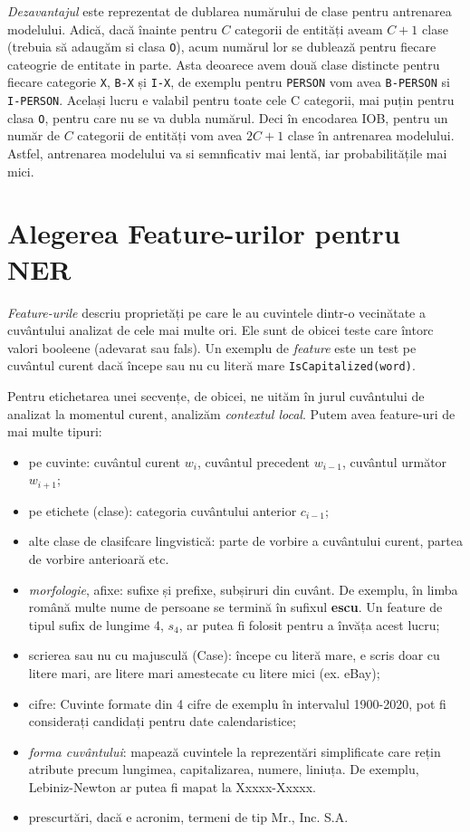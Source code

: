 \textit{Dezavantajul} este reprezentat de dublarea numărului de clase pentru antrenarea modelului. Adică, dacă înainte pentru $C$ categorii de entități aveam $C + 1 $ clase (trebuia să adaugăm si clasa \texttt{O}), acum numărul lor se dublează pentru fiecare cateogrie de entitate in parte. Asta deoarece avem două clase distincte pentru fiecare categorie \texttt{X}, \texttt{B-X} și \texttt{I-X}, de exemplu pentru \texttt{PERSON} vom avea \texttt{B-PERSON} si \texttt{I-PERSON}. Același lucru e valabil pentru toate cele C categorii, mai puțin pentru clasa \texttt{O}, pentru care nu se va dubla numărul. Deci în encodarea IOB, pentru un număr de $C$ categorii de entități vom avea $2C + 1 $ clase în antrenarea modelului. Astfel, antrenarea modelului va si semnficativ mai lentă, iar probabilitățile mai mici.

\section{Alegerea Feature-urilor pentru NER}

\textit{Feature-urile} descriu proprietăți pe care le au cuvintele dintr-o vecinătate a cuvântului analizat de cele mai multe ori. Ele sunt de obicei teste care întorc valori booleene (adevarat sau fals). Un exemplu de \textit{feature} este un test pe cuvântul curent dacă începe sau nu cu literă mare \texttt{IsCapitalized(word)}.

Pentru etichetarea unei secvențe, de obicei, ne uităm în jurul cuvântului de analizat la momentul curent, analizăm \textit{contextul local}. Putem avea feature-uri de mai multe tipuri:

\begin{itemize}
\item pe cuvinte: cuvântul curent $w_i$, cuvântul precedent $w_{i-1}$, cuvântul următor $w_{i+1}$;
\item pe etichete (clase): categoria cuvântului anterior $c_{i-1}$;
\item alte clase de clasifcare lingvistică: parte de vorbire a cuvântului curent, partea de vorbire anterioară etc.
\item \textit{morfologie}, afixe: sufixe și prefixe, subșiruri din cuvânt. De exemplu, în limba română multe nume de persoane se termină în sufixul \textbf{escu}. Un feature de tipul sufix de lungime 4, $s_4$, ar putea fi folosit pentru a învăța acest lucru;
\item scrierea sau nu cu majusculă (Case): începe cu literă mare, e scris doar cu litere mari, are litere mari amestecate cu litere mici (ex. eBay);
\item cifre: Cuvinte formate din 4 cifre de exemplu  în intervalul 1900-2020, pot fi considerați candidați pentru date calendaristice;
\item \textit{forma cuvântului}: mapează cuvintele la reprezentări simplificate care rețin atribute precum lungimea, capitalizarea, numere, liniuța. De exemplu, Lebiniz-Newton ar putea fi mapat la Xxxxx-Xxxxx.
\item prescurtări, dacă e acronim, termeni de tip Mr., Inc. S.A.

\end{itemize}

